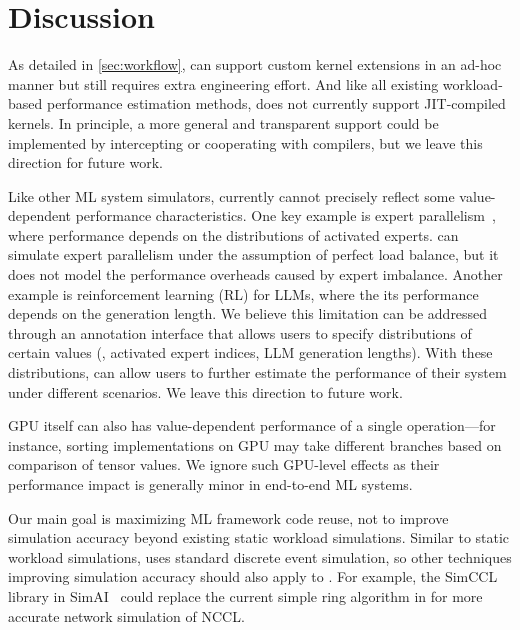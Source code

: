 \section{Discussion}
\label{sec:discussion}

 As detailed in \autoref{sec:workflow}, \sys can support custom kernel extensions in an ad-hoc manner but still requires extra engineering effort. And like all existing workload-based performance estimation methods, \sys does not currently support JIT-compiled kernels. In principle, a more general and transparent support could be implemented by intercepting or cooperating with compilers, but we leave this direction for future work.

Like other ML system simulators, \sys currently cannot precisely reflect some value-dependent performance characteristics. One key example is expert parallelism~\cite{lepikhin2021gshard}, where performance depends on the distributions of activated experts. \sys can simulate expert parallelism under the assumption of perfect load balance, but it does not model the performance overheads caused by expert imbalance. Another example is reinforcement learning (RL) for LLMs, where the its performance depends on the generation length.
We believe this limitation can be addressed through an annotation interface that allows users to specify distributions of certain values (\eg, activated expert indices, LLM generation lengths). With these distributions, \sys can allow users to further estimate the performance of their system under different scenarios. We leave this direction to future work.

GPU itself can also has value-dependent performance of a single operation—for instance, sorting implementations on GPU may take different branches based on comparison of tensor values. We ignore such GPU-level effects as their performance impact is generally minor in end-to-end ML systems.

Our main goal is maximizing ML framework code reuse, not to improve simulation accuracy beyond existing static workload simulations.
Similar to static workload simulations, \sys uses standard discrete event simulation, so other techniques improving simulation accuracy should also apply to \sys. For example, the SimCCL library in SimAI~\cite{wang2025simai} could replace the current simple ring algorithm in \sys for more accurate network simulation of NCCL.

